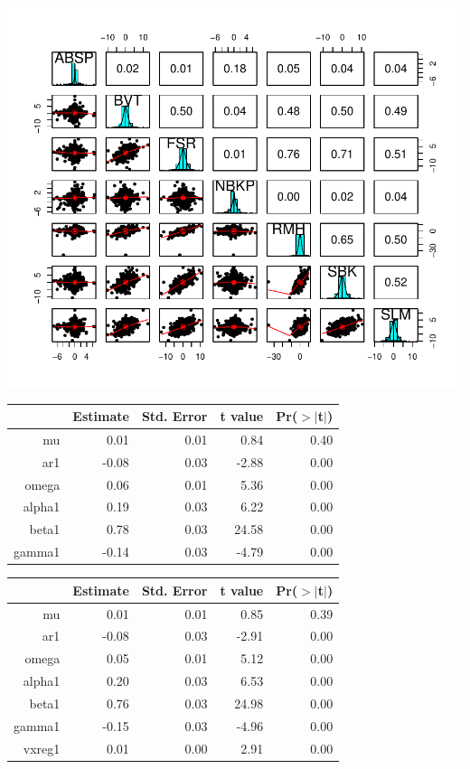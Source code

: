 \documentclass[11pt,preprint, authoryear]{elsarticle}
\let\origfigure\figure
\let\endorigfigure\endfigure
\renewenvironment{figure}[1][2] {
    \expandafter\origfigure\expandafter[H]
} {
    \endorigfigure
}
\let\origtable\table
\let\endorigtable\endtable
\renewenvironment{table}[1][2] {
    \expandafter\origtable\expandafter[H]
} {
    \endorigtable
}
\numberwithin{equation}{section}
\numberwithin{figure}{section}
\numberwithin{table}{section}
\begin{document}
\begin{figure}[H]

{\centering \includegraphics{Template_files/figure-latex/figure3-1} 

}

\caption{Pairs Panel \label{lit}}\label{fig:figure3}
\end{figure}

\begin{table}[H]
\centering
\begin{tabular}{rrrrr}
  \hline
 &  Estimate &  Std. Error &  t value & Pr($>$$|$t$|$) \\ 
  \hline
mu & 0.01 & 0.01 & 0.84 & 0.40 \\ 
  ar1 & -0.08 & 0.03 & -2.88 & 0.00 \\ 
  omega & 0.06 & 0.01 & 5.36 & 0.00 \\ 
  alpha1 & 0.19 & 0.03 & 6.22 & 0.00 \\ 
  beta1 & 0.78 & 0.03 & 24.58 & 0.00 \\ 
  gamma1 & -0.14 & 0.03 & -4.79 & 0.00 \\ 
   \hline
\end{tabular}
\caption{GARCH11 \label{tab1}} 
\end{table}\begin{table}[H]
\centering
\begin{tabular}{rrrrr}
  \hline
 &  Estimate &  Std. Error &  t value & Pr($>$$|$t$|$) \\ 
  \hline
mu & 0.01 & 0.01 & 0.85 & 0.39 \\ 
  ar1 & -0.08 & 0.03 & -2.91 & 0.00 \\ 
  omega & 0.05 & 0.01 & 5.12 & 0.00 \\ 
  alpha1 & 0.20 & 0.03 & 6.53 & 0.00 \\ 
  beta1 & 0.76 & 0.03 & 24.98 & 0.00 \\ 
  gamma1 & -0.15 & 0.03 & -4.96 & 0.00 \\ 
  vxreg1 & 0.01 & 0.00 & 2.91 & 0.00 \\ 
   \hline
\end{tabular}
\caption{GARCH11 with SLM external regressor  \label{tab1}} 
\end{table}
\end{document}
